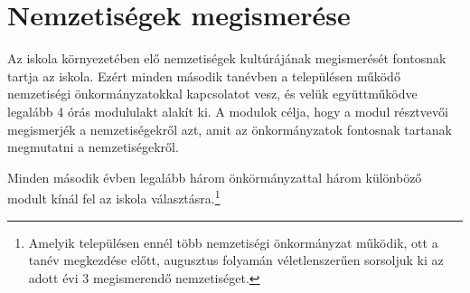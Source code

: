 \section{Nemzetiségek megismerése}
\label{sec:nemzetiseg}

Az iskola környezetében elő nemzetiségek kultúrájának megismerését fontosnak tartja az iskola. Ezért minden második tanévben a településen működő nemzetiségi önkormányzatokkal kapcsolatot vesz, és  velük együttműködve legalább 4 órás modululakt alakít ki. A modulok célja, hogy a modul résztvevői megismerjék a nemzetiségekről azt, amit az önkormányzatok fontosnak tartanak megmutatni a nemzetiségekről.

Minden második évben legalább három önkörmányzattal három különböző modult kínál fel az iskola választásra.\footnote{Amelyik településen ennél több nemzetiségi önkormányzat működik, ott a tanév megkezdése előtt, augusztus folyamán véletlenszerűen sorsoljuk ki az adott évi 3 megismerendő nemzetiséget.}